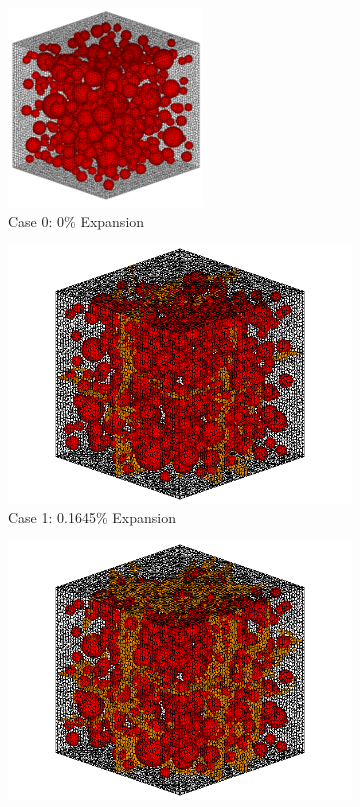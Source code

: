 \begin{figure}[!h]
\centering

    \begin{subfigure}{.5\textwidth}
      \centering
      \includegraphics[width=.6\linewidth]{Files/exp_3D/A15Undamaged.png}
    \caption{Case 0: 0\% Expansion}
    \end{subfigure}%
    \begin{subfigure}{.5\textwidth}
      \centering
      \includegraphics[width=.8\linewidth]{Files/exp_3D/DEF/A15X0C_1_c.png}
    \caption{Case 1: 0.1645\% Expansion}
    \end{subfigure}
    \begin{subfigure}{.5\textwidth}
      \centering
      \includegraphics[width=.8\linewidth]{Files/exp_3D/DEF/A15X0C_2_c.png}

\end{subfigure}
\end{figure}
